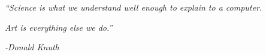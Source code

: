 \clearpage
{}

\begin{center}
\vspace*{9cm}
\textit{``Science is what we understand well enough to explain to a computer.}

\textit{Art is everything else we do.''}
\end{center}
\par
\hspace*{7cm}
\textit{-Donald Knuth}
